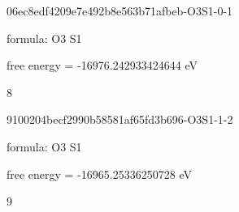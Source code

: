 \documentclass{article}
\begin{document}
\vspace{1cm}


06ec8edf4209e7e492b8e563b71afbeb-O3S1-0-1



formula: O3 S1



free energy = -16976.242933424644 eV

8

\vspace{1cm}


9100204becf2990b58581af65fd3b696-O3S1-1-2



formula: O3 S1



free energy = -16965.25336250728 eV

9
\end{document}
